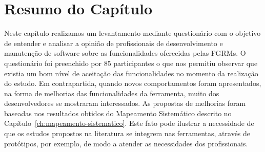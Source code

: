 \section{Resumo do Capítulo}
\label{sec:resumo_do_capitulo}

Neste capítulo realizamos um levantamento mediante questionário com o objetivo
de entender e analisar a opinião de profissionais de desenvolvimento e
manutenção de software sobre as funcionalidades oferecidas pelas FGRMs. O
questionário foi preenchido por 85 participantes o que nos permitiu observar que
existia um bom nível de aceitação das funcionalidades no momento da realização
do estudo. Em contrapartida, quando novos comportamentos foram apresentados, na
forma de melhorias das funcionalidades da ferramenta, muito dos desenvolvedores
se mostraram interessados. As propostas de melhorias foram baseadas nos
resultados obtidos do Mapeamento Sistemático descrito no
Capítulo~\ref{ch:mapeamento-sistematico}. Este fato pode ilustrar a necessidade
de que os estudos propostos na literatura se integrem nas ferramentas, através
de protótipos, por exemplo, de modo a atender as necessidades dos profissionais.
